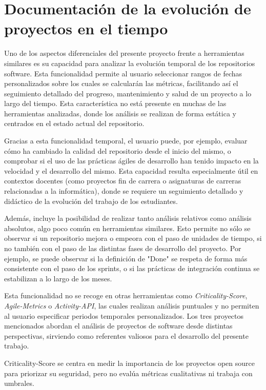 
\section{Documentación de la evolución de proyectos en el tiempo}

Uno de los aspectos diferenciales del presente proyecto frente a herramientas similares es su capacidad para analizar la evolución temporal de los repositorios software. Esta funcionalidad permite al usuario seleccionar rangos de fechas personalizados sobre los cuales se calcularán las métricas, facilitando así el seguimiento detallado del progreso, mantenimiento y salud de un proyecto a lo largo del tiempo. Esta característica no está presente en muchas de las herramientas analizadas, donde los análisis se realizan de forma estática y centrados en el estado actual del repositorio.

Gracias a esta funcionalidad temporal, el usuario puede, por ejemplo, evaluar cómo ha cambiado la calidad del repositorio desde el inicio del mismo, o comprobar si el uso de las prácticas ágiles de desarrollo han tenido impacto en la velocidad y el desarrollo del mismo. Esta capacidad resulta especialmente útil en contextos docentes (como proyectos fin de carrera o asignaturas de carreras relacionadas a la informática), donde se requiere un seguimiento detallado y didáctico de la evolución del trabajo de los estudiantes.

Además, incluye la posibilidad de realizar tanto análisis relativos como análisis absolutos, algo poco común en herramientas similares. Esto permite no sólo se observar si un repositorio mejora o empeora con el paso de unidades de tiempo, si no también con el paso de las distintas fases de desarrollo del proyecto. Por ejemplo, se puede observar si la definición de "Done" se respeta de forma más consistente con el paso de los sprints, o si las prácticas de integración continua se estabilizan a lo largo de los meses.

Esta funcionalidad no se recoge en otras herramientas como \textit{Criticality-Score}, \textit{Agile-Metrics} o \textit{Activity-API}, las cuales realizan análisis puntuales y no permiten al usuario especificar periodos temporales personalizados. Los tres proyectos mencionados abordan el análisis de proyectos de software desde distintas perspectivas, sirviendo como referentes valiosos para el desarrollo del presente trabajo. 

Criticality-Score se centra en medir la importancia de los proyectos open source para priorizar su seguridad, pero no evalúa métricas cualitativas ni trabaja con umbrales.

